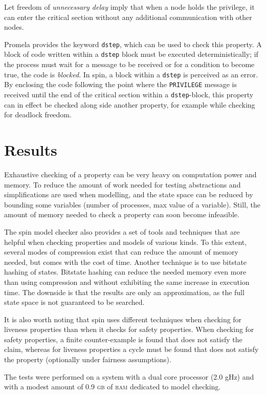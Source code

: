 \documentclass[a4paper,10pt]{llncs}
\begin{document}
Let freedom of \emph{unnecessary delay} imply that when a node holds the privilege, it can enter the critical section without any additional communication with other nodes.

Promela provides the keyword \texttt{dstep}, which can be used to check this property. A block of code written within a \texttt{dstep} block must be executed deterministically; if the process must wait for a message to be received or for a condition to become true, the code is \emph{blocked}. In spin, a block within a \texttt{dstep} is perceived as an error. By enclosing the code following the point where the \texttt{PRIVILEGE} message is received until the end of the critical section within a \texttt{dstep}-block, this property can in effect be checked along side another property, for example while checking for deadlock freedom.

\section{Results}
Exhaustive checking of a property can be very heavy on computation power and memory. To reduce the amount of work needed for testing abstractions and simplifications are used when modelling, and the state space can be reduced by bounding some variables (number of processes, max value of a variable). Still, the amount of memory needed to check a property can soon become infeasible.

The spin model checker also provides a set of tools and techniques that are helpful when checking properties and models of various kinds. To this extent, several modes of compression exist that can reduce the amount of memory needed, but comes with the cost of time. Another technique is to use bitstate hashing of states. Bitstate hashing can reduce the needed memory even more than using compression and without exhibiting the same increase in execution time. The downside is that the results are only an approximation, as the full state space is not guaranteed to be searched.

It is also worth noting that spin uses different techniques when checking for liveness properties than when it checks for safety properties. When checking for safety properties, a finite counter-example is found that does not satisfy the claim, whereas for liveness properties a cycle must be found that does not satisfy the property (optionally under fairness assumptions).

The tests were performed on a system with a dual core processor (2.0 gHz) and with a modest amount of 0.9 \textsc{gb} of \textsc{ram} dedicated to model checking.
\end{document}
